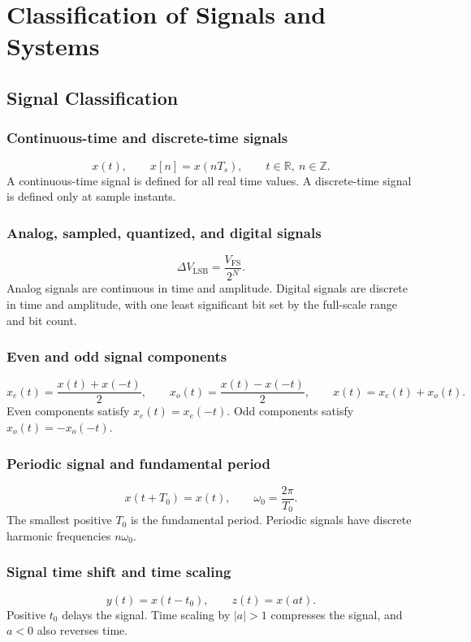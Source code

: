 \section{Classification of Signals and Systems}

\subsection{Signal Classification}

\subsubsection{Continuous-time and discrete-time signals}
\[
x(t), \qquad x[n]=x(nT_s), \qquad t\in\mathbb{R},\ n\in\mathbb{Z}.
\]
A continuous-time signal is defined for all real time values. A discrete-time signal is defined only at sample instants.

\subsubsection{Analog, sampled, quantized, and digital signals}
\[
\Delta V_{\mathrm{LSB}}=\frac{V_{\mathrm{FS}}}{2^N}.
\]
Analog signals are continuous in time and amplitude. Digital signals are discrete in time and amplitude, with one least significant bit set by the full-scale range and bit count.

\subsubsection{Even and odd signal components}
\[
x_e(t)=\frac{x(t)+x(-t)}{2}, \qquad
x_o(t)=\frac{x(t)-x(-t)}{2}, \qquad x(t)=x_e(t)+x_o(t).
\]
Even components satisfy \(x_e(t)=x_e(-t)\). Odd components satisfy \(x_o(t)=-x_o(-t)\).

\subsubsection{Periodic signal and fundamental period}
\[
x(t+T_0)=x(t), \qquad \omega_0=\frac{2\pi}{T_0}.
\]
The smallest positive \(T_0\) is the fundamental period. Periodic signals have discrete harmonic frequencies \(n\omega_0\).

\subsubsection{Signal time shift and time scaling}
\[
y(t)=x(t-t_0), \qquad z(t)=x(at).
\]
Positive \(t_0\) delays the signal. Time scaling by \(|a|>1\) compresses the signal, and \(a<0\) also reverses time.

